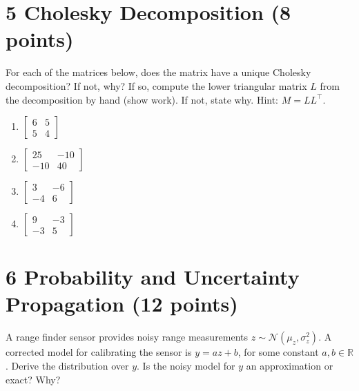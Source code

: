 \documentclass{article}
\theoremstyle{definition}
\begin{document}
\section*{5 Cholesky Decomposition (8 points)}
For each of the matrices below, does the matrix have a unique Cholesky decomposition? If not, why? If so, compute the lower triangular matrix $L$ from the decomposition by hand (show work). If not, state why. Hint: $M=L L^{\top}$.
\begin{enumerate}[label=(\alph*)]
\item
$
\left[\begin{array}{ll}
6 & 5 \\
5 & 4
\end{array}\right]
$

\item$\left[\begin{array}{cc}25 & -10 \\ -10 & 40\end{array}\right] \quad$ 
\item$\left[\begin{array}{cc}3 & -6 \\ -4 & 6\end{array}\right] \quad$ 
\item$\left[\begin{array}{cc}9 & -3 \\ -3 & 5\end{array}\right] \quad$ 
\end{enumerate}
\section*{6 Probability and Uncertainty Propagation (12 points)}
A range finder sensor provides noisy range measurements $z \sim \mathcal{N}\left(\mu_{z}, \sigma_{z}^{2}\right)$. A corrected model for calibrating the sensor is $y=a z+b$, for some constant $a, b \in \mathbb{R}$. Derive the distribution over $y$. Is the noisy model for $y$ an approximation or exact? Why?
\end{document}
